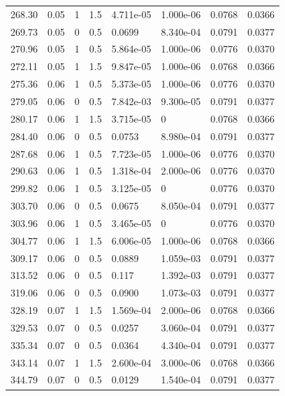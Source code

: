 \documentclass[preview]{standalone}
\begin{document}
{{{\begin{tabular}{L{1.2cm}C{1.2cm} C{0.3cm}C{0.5cm} C{1.4cm}C{1.4cm} C{1.4cm}C{1.4cm}}
  268.30  &  0.05  & 1     & 1.5 &  4.711e-05  & 1.000e-06  & 0.0768 &  0.0366   \\ 
  269.73  &  0.05  & 0     & 0.5 &  0.0699  & 8.340e-04  & 0.0791 &  0.0377   \\ 
  270.96  &  0.05  & 1     & 0.5 &  5.864e-05  & 1.000e-06  & 0.0776 &  0.0370   \\ 
  272.11  &  0.05  & 1     & 1.5 &  9.847e-05  & 1.000e-06  & 0.0768 &  0.0366   \\ 
  275.36  &  0.06  & 1     & 0.5 &  5.373e-05  & 1.000e-06  & 0.0776 &  0.0370   \\ 
  279.05  &  0.06  & 0     & 0.5 &  7.842e-03  & 9.300e-05  & 0.0791 &  0.0377   \\ 
  280.17  &  0.06  & 1     & 1.5 &  3.715e-05  & 0  & 0.0768 &  0.0366   \\ 
  284.40  &  0.06  & 0     & 0.5 &  0.0753  & 8.980e-04  & 0.0791 &  0.0377   \\ 
  287.68  &  0.06  & 1     & 0.5 &  7.723e-05  & 1.000e-06  & 0.0776 &  0.0370   \\ 
  290.63  &  0.06  & 1     & 0.5 &  1.318e-04  & 2.000e-06  & 0.0776 &  0.0370   \\ 
  299.82  &  0.06  & 1     & 0.5 &  3.125e-05  & 0  & 0.0776 &  0.0370   \\ 
  303.70  &  0.06  & 0     & 0.5 &  0.0675  & 8.050e-04  & 0.0791 &  0.0377   \\ 
  303.96  &  0.06  & 1     & 0.5 &  3.465e-05  & 0  & 0.0776 &  0.0370   \\ 
  304.77  &  0.06  & 1     & 1.5 &  6.006e-05  & 1.000e-06  & 0.0768 &  0.0366   \\ 
  309.17  &  0.06  & 0     & 0.5 &  0.0889  & 1.059e-03  & 0.0791 &  0.0377   \\ 
  313.52  &  0.06  & 0     & 0.5 &  0.117  & 1.392e-03  & 0.0791 &  0.0377   \\ 
  319.06  &  0.06  & 0     & 0.5 &  0.0900  & 1.073e-03  & 0.0791 &  0.0377   \\ 
  328.19  &  0.07  & 1     & 1.5 &  1.569e-04  & 2.000e-06  & 0.0768 &  0.0366   \\ 
  329.53  &  0.07  & 0     & 0.5 &  0.0257  & 3.060e-04  & 0.0791 &  0.0377   \\ 
  335.34  &  0.07  & 0     & 0.5 &  0.0364  & 4.340e-04  & 0.0791 &  0.0377   \\ 
  343.14  &  0.07  & 1     & 1.5 &  2.600e-04  & 3.000e-06  & 0.0768 &  0.0366   \\ 
  344.79  &  0.07  & 0     & 0.5 &  0.0129  & 1.540e-04  & 0.0791 &  0.0377   \\ 

\end{tabular}}}}
\end{document}
